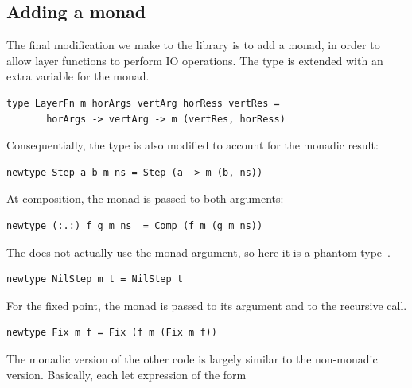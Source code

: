\documentclass[preprint,natbib]{sigplanconf}
\begin{document}
%																
\subsection{Adding a monad}


The final modification we make to the library is to add a monad, in order to allow layer functions to perform IO operations. The type  is extended with an extra variable  for the monad.

\begin{small}
\begin{verbatim}
type LayerFn m horArgs vertArg horRess vertRes =
       horArgs -> vertArg -> m (vertRes, horRess)
\end{verbatim}
\end{small}

Consequentially, the  type is also modified to account for the monadic result:

\begin{small}
\begin{verbatim}
newtype Step a b m ns = Step (a -> m (b, ns))
\end{verbatim}
\end{small}

At composition, the monad is passed to both arguments:

\begin{small}
\begin{verbatim}
newtype (:.:) f g m ns  = Comp (f m (g m ns))
\end{verbatim}
\end{small}

The  does not actually use the monad argument, so here it is a phantom type~\cite{leijen99dsecs}.

\begin{small}
\begin{verbatim}
newtype NilStep m t = NilStep t
\end{verbatim}
\end{small}

For the fixed point, the monad is passed to its argument and to the recursive call.

\begin{small}
\begin{verbatim}
newtype Fix m f = Fix (f m (Fix m f))
\end{verbatim}
\end{small}

The monadic version of the other code is largely similar to the non-monadic version. Basically, each let expression of the form
\end{document}
